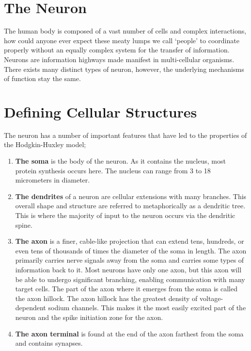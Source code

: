 \documentclass[Orator]{subfiles}
\begin{document}
\section{The Neuron}



The human body is composed of a vast number of cells and complex interactions, how could anyone ever expect these meaty lumps we call `people' to coordinate properly without an equally complex system for the transfer of information. 
Neurons are information highways made manifest in multi-cellular organisms. 
There exists many distinct types of neuron, however, the underlying mechanisms of function stay the same.


\section{Defining Cellular Structures}

The neuron has a number of important features that have led to the properties of the Hodgkin-Huxley model;
\begin{enumerate}
    \item \textbf{The soma} is the body of the neuron. As it contains the nucleus, most protein synthesis occurs here. The nucleus can range from 3 to 18 micrometers in diameter.
    \item \textbf{The dendrites} of a neuron are cellular extensions with many branches. This overall shape and structure are referred to metaphorically as a dendritic tree. This is where the majority of input to the neuron occurs via the dendritic spine.
    \item \textbf{The axon} is a finer, cable-like projection that can extend tens, hundreds, or even tens of thousands of times the diameter of the soma in length. The axon primarily carries nerve signals away from the soma and carries some types of information back to it. Most neurons have only one axon, but this axon will be able to undergo significant branching, enabling communication with many target cells. The part of the axon where it emerges from the soma is called the axon hillock. The axon hillock has the greatest density of voltage-dependent sodium channels. This makes it the most easily excited part of the neuron and the spike initiation zone for the axon. 
    \item \textbf{The axon terminal} is found at the end of the axon farthest from the soma and contains synapses. 
\end{enumerate}
\end{document}
